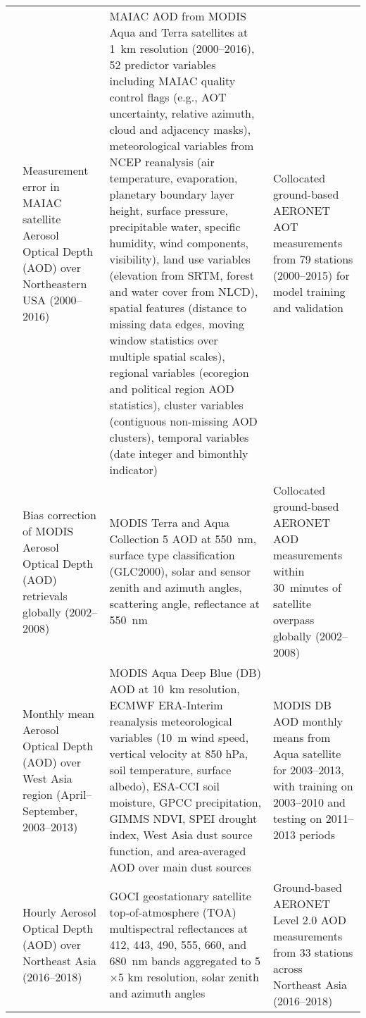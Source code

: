 \documentclass[11pt]{article}
\begin{document}
\begin{landscape}
\begin{longtable}{>{\raggedright\arraybackslash}p{2cm} 
        >{\raggedright\arraybackslash}p{4cm} 
        >{\raggedright\arraybackslash}p{10cm} 
        >{\raggedright\arraybackslash}p{6cm}}
\citet{just2018correcting} & Measurement error in MAIAC satellite Aerosol Optical Depth (AOD) over Northeastern USA (2000–2016) & MAIAC AOD from MODIS Aqua and Terra satellites at 1~km resolution (2000–2016), 52 predictor variables including MAIAC quality control flags (e.g., AOT uncertainty, relative azimuth, cloud and adjacency masks), meteorological variables from NCEP reanalysis (air temperature, evaporation, planetary boundary layer height, surface pressure, precipitable water, specific humidity, wind components, visibility), land use variables (elevation from SRTM, forest and water cover from NLCD), spatial features (distance to missing data edges, moving window statistics over multiple spatial scales), regional variables (ecoregion and political region AOD statistics), cluster variables (contiguous non-missing AOD clusters), temporal variables (date integer and bimonthly indicator) & Collocated ground-based AERONET AOT measurements from 79 stations (2000–2015) for model training and validation \\[6pt]

\citet{lary2009machine} & Bias correction of MODIS Aerosol Optical Depth (AOD) retrievals globally (2002–2008) & MODIS Terra and Aqua Collection 5 AOD at 550~nm, surface type classification (GLC2000), solar and sensor zenith and azimuth angles, scattering angle, reflectance at 550~nm & Collocated ground-based AERONET AOD measurements within 30~minutes of satellite overpass globally (2002–2008) \\[6pt]

\citet{nabavi2018prediction} & Monthly mean Aerosol Optical Depth (AOD) over West Asia region (April–September, 2003–2013) & MODIS Aqua Deep Blue (DB) AOD at 10~km resolution, ECMWF ERA-Interim reanalysis meteorological variables (10~m wind speed, vertical velocity at 850 hPa, soil temperature, surface albedo), ESA-CCI soil moisture, GPCC precipitation, GIMMS NDVI, SPEI drought index, West Asia dust source function, and area-averaged AOD over main dust sources & MODIS DB AOD monthly means from Aqua satellite for 2003–2013, with training on 2003–2010 and testing on 2011–2013 periods \\[6pt]

\citet{yeom2021estimation} & Hourly Aerosol Optical Depth (AOD) over Northeast Asia (2016–2018) & GOCI geostationary satellite top-of-atmosphere (TOA) multispectral reflectances at 412, 443, 490, 555, 660, and 680~nm bands aggregated to 5$\times$5 km resolution, solar zenith and azimuth angles & Ground-based AERONET Level 2.0 AOD measurements from 33 stations across Northeast Asia (2016–2018) \\[6pt]


\end{longtable}
\end{landscape}
\end{document}
